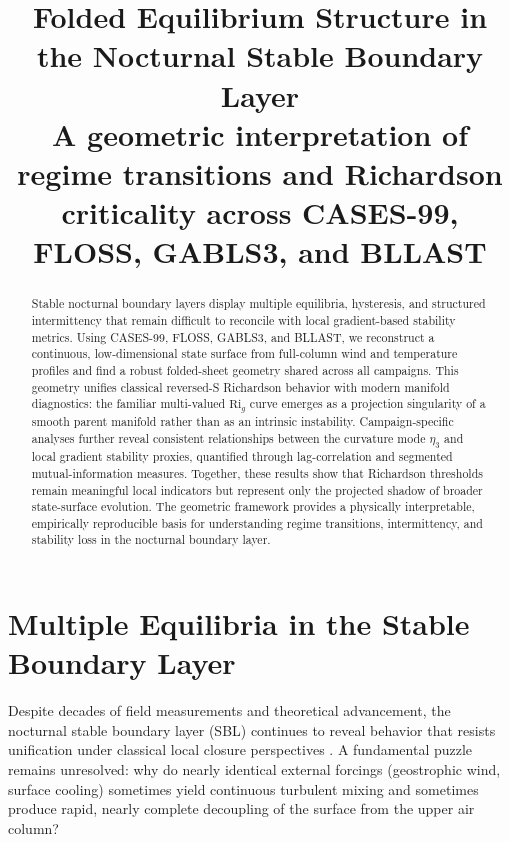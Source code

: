 \documentclass[12pt,a4paper]{article}
\title{Folded Equilibrium Structure in the Nocturnal Stable Boundary Layer\\\large A geometric interpretation of regime transitions and Richardson criticality across CASES-99, FLOSS, GABLS3, and BLLAST}
\author{}
\date{}
\begin{document}
\maketitle

\begin{abstract}
Stable nocturnal boundary layers display multiple equilibria, hysteresis, and structured intermittency that remain difficult to reconcile with local gradient-based stability metrics. Using CASES-99, FLOSS, GABLS3, and BLLAST, we reconstruct a continuous, low-dimensional state surface from full-column wind and temperature profiles and find a robust folded-sheet geometry shared across all campaigns. This geometry unifies classical reversed-S Richardson behavior with modern manifold diagnostics: the familiar multi-valued $\mathrm{Ri}_g$ curve emerges as a projection singularity of a smooth parent manifold rather than as an intrinsic instability. Campaign-specific analyses further reveal consistent relationships between the curvature mode $\eta_3$ and local gradient stability proxies, quantified through lag-correlation and segmented mutual-information measures. Together, these results show that Richardson thresholds remain meaningful local indicators but represent only the projected shadow of broader state-surface evolution. The geometric framework provides a physically interpretable, empirically reproducible basis for understanding regime transitions, intermittency, and stability loss in the nocturnal boundary layer.
\end{abstract}

\section{Multiple Equilibria in the Stable Boundary Layer}

Despite decades of field measurements and theoretical advancement, the nocturnal stable boundary layer (SBL) continues to reveal behavior that resists unification under classical local closure perspectives \citep{stull1988}. A fundamental puzzle remains unresolved: why do nearly identical external forcings (geostrophic wind, surface cooling) sometimes yield continuous turbulent mixing and sometimes produce rapid, nearly complete decoupling of the surface from the upper air column?
\end{document}
